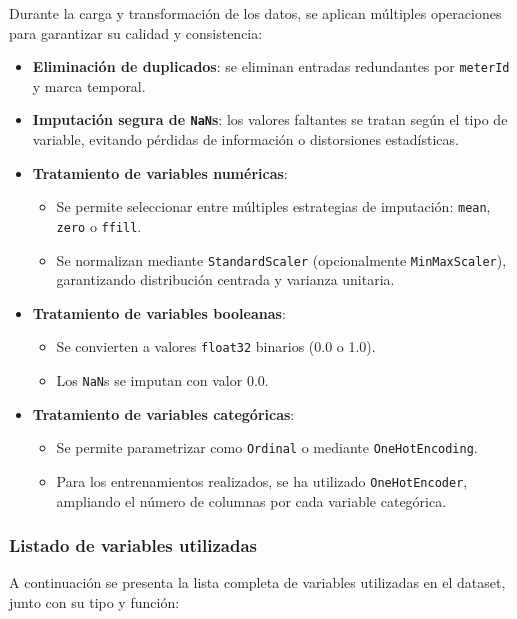 Durante la carga y transformación de los datos, se aplican múltiples operaciones para garantizar su calidad y consistencia:

\begin{itemize}
	\item \textbf{Eliminación de duplicados}: se eliminan entradas redundantes por \texttt{meterId} y marca temporal.
	\item \textbf{Imputación segura de \texttt{NaN}s}: los valores faltantes se tratan según el tipo de variable, evitando pérdidas de información o distorsiones estadísticas.
	\item \textbf{Tratamiento de variables numéricas}:
	\begin{itemize}
		\item Se permite seleccionar entre múltiples estrategias de imputación: \texttt{mean}, \texttt{zero} o \texttt{ffill}.
		\item Se normalizan mediante \texttt{StandardScaler} (opcionalmente \texttt{MinMaxScaler}), garantizando distribución centrada y varianza unitaria.
	\end{itemize}
	\item \textbf{Tratamiento de variables booleanas}:
	\begin{itemize}
		\item Se convierten a valores \texttt{float32} binarios (0.0 o 1.0).
		\item Los \texttt{NaN}s se imputan con valor 0.0.
	\end{itemize}
	\item \textbf{Tratamiento de variables categóricas}:
	\begin{itemize}
		\item Se permite parametrizar como \texttt{Ordinal} o mediante \texttt{OneHotEncoding}.
		\item Para los entrenamientos realizados, se ha utilizado \texttt{OneHotEncoder}, ampliando el número de columnas por cada variable categórica.
	\end{itemize}
\end{itemize}

\subsubsection*{Listado de variables utilizadas}

A continuación se presenta la lista completa de variables utilizadas en el dataset, junto con su tipo y función:

